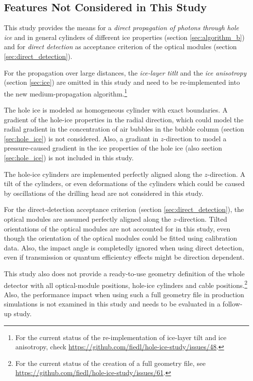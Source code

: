 
\subsection{Features Not Considered in This Study}
\label{sec:ice_features_not_considered}

This study provides the means for a \textit{direct propagation of photons through hole ice} and in general cylinders of different ice properties (section \ref{sec:algorithm_b}) and for \textit{direct detection} as acceptance criterion of the optical modules (section \ref{sec:direct_detection}).

For the propagation over large distances, the \textit{ice-layer titlt} and the \textit{ice anisotropy} (section \ref{sec:ice}) are omitted in this study and need to be re-implemented into the new medium-propagation algorithm.\footnote{For the current status of the re-implementation of ice-layer tilt and ice anisotropy, check \url{https://github.com/fiedl/hole-ice-study/issues/48}.}

The hole ice is modeled as homogeneous cylinder with exact boundaries. A gradient of the hole-ice properties in the radial direction, which could model the radial gradient in the concentration of air bubbles in the bubble column (section \ref{sec:hole_ice}) is not considered. Also, a gradiant in $z$-direction to model a pressure-caused gradient in the ice properties of the hole ice (also section \ref{sec:hole_ice}) is not included in this study.

The hole-ice cylinders are implemented perfectly aligned along the $z$-direction. A tilt of the cylinders, or even deformations of the cylinders which could be caused by oscillations of the drilling head are not considered in this study.

For the direct-detection acceptance criterion (section \ref{sec:direct_detection}), the optical modules are assumed perfectly aligned along the $z$-direction. Tilted orientations of the optical modules are not accounted for in this study, even though the orientation of the optical modules could be fitted using calibration data. Also, the impact angle is completedly ignored when using direct detection, even if transmission or quantum efficientcy effects might be direction dependent.

This study also does not provide a ready-to-use geometry definition of the whole detector with all optical-module positions, hole-ice cylinders and cable positions.\footnote{For the current status of the creation of a full geometry file, see \url{https://github.com/fiedl/hole-ice-study/issues/61}.} Also, the performance impact when using such a full geometry file in production simulations is not examined in this study and needs to be evaluated in a follow-up study.\followup

